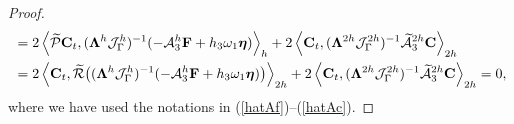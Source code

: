 \begin{proof}
\begin{align*}
& = 2\left<\widetilde{\mathcal{P}}{\bf C}_t,(\bm{\Lambda}^{h}\mathcal{J}^h_\Gamma)^{-1}(-\mathcal{A}_3^h{\bf F}+h_3\omega_1{\bm \eta})\right>_{h}+ 2\left<{\bf C}_t, (\bm{\Lambda}^{2h}\mathcal{J}^{2h}_\Gamma)^{-1}\widetilde{\mathcal{A}}_3^{2h}{\bf C}\right>_{2h} \nonumber\\
& = 2\left<{\bf C}_t,\widetilde{\mathcal{R}}\big((\bm{\Lambda}^{h}\mathcal{J}^h_\Gamma)^{-1}(-\mathcal{A}_3^h{\bf F}+h_3\omega_1{\bm \eta})\big)\right>_{2h}+ 2\left<{\bf C}_t,(\bm{\Lambda}^{2h}\mathcal{J}^{2h}_\Gamma)^{-1}\widetilde{\mathcal{A}}_3^{2h}{\bf C}\right>_{2h} = 0,
\end{align*}
where we have used the notations in (\ref{hatAf})--(\ref{hatAc}).
\end{proof}